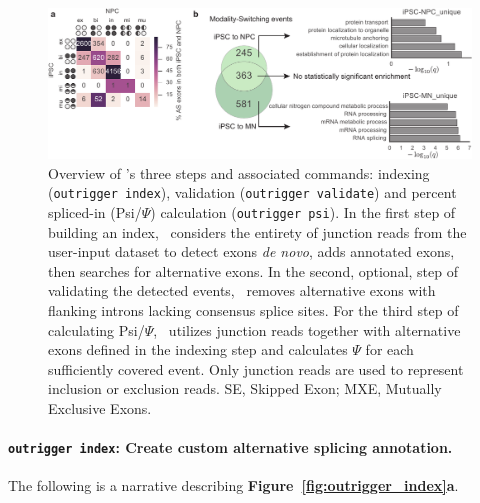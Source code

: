 \begin{figure}[h]
  \centering
  \includegraphics[width=5.8in]{figures/switching_modalities.pdf}
  \caption[Overview of \outrigger's three steps and associated commands: indexing (\texttt{outrigger index}), validation (\texttt{outrigger validate}) and percent spliced-in (Psi/$\Psi$) calculation (\texttt{outrigger psi})]{Overview of \outrigger's three steps and associated commands: indexing (\texttt{outrigger index}), validation (\texttt{outrigger validate}) and percent spliced-in (Psi/$\Psi$) calculation (\texttt{outrigger psi}). In the first step of building an index, \outrigger\, considers the entirety of junction reads from the user-input dataset to detect exons \emph{de novo}, adds annotated exons, then searches for alternative exons. In the second, optional, step of validating the detected events, \outrigger\, removes alternative exons with flanking introns lacking consensus splice sites. For the third step of calculating Psi/$\Psi$, \outrigger\, utilizes junction reads together with alternative exons defined in the indexing step and calculates $\Psi$ for each sufficiently covered event. Only junction reads are used to represent inclusion or exclusion reads. SE, Skipped Exon; MXE, Mutually Exclusive Exons.
  }
  \label{fig:outrigger_overview}
\end{figure}




\paragraph{\texttt{outrigger index}: Create custom alternative splicing annotation.} The following is a narrative describing \textbf{Figure~\ref{fig:outrigger_index}a}.


